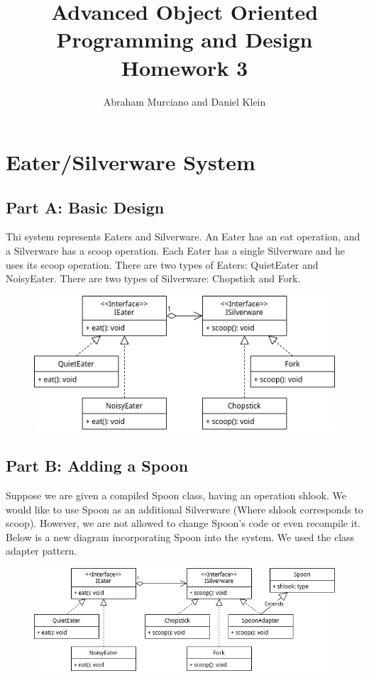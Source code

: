 \documentclass{article}
\title{Advanced Object Oriented Programming and Design\\
\medskip
\large Homework 3}
\author{Abraham Murciano and Daniel Klein}
\begin{document}
\maketitle

\section{Eater/Silverware System}

\subsection*{Part A: Basic Design}

Thi system represents Eaters and Silverware. An Eater has an eat operation, and a Silverware has a scoop operation. Each Eater has a single Silverware and he uses its scoop operation. There are two types of Eaters: QuietEater and NoisyEater. There are two types of Silverware: Chopstick and Fork.

\begin{figure}[ht]
	\includegraphics[width=\textwidth]{hw4q1a.png}
\end{figure}

\subsection*{Part B: Adding a Spoon}

Suppose we are given a compiled Spoon class, having an operation shlook. We would like to use Spoon as an additional Silverware (Where shlook corresponds to scoop). However, we are not allowed to change Spoon's code or even recompile it. Below is a new diagram incorporating Spoon into the system. We used the class adapter pattern.

\begin{figure}[ht]
	\includegraphics[width=\textwidth]{hw4q1b.png}
\end{figure}
\end{document}
